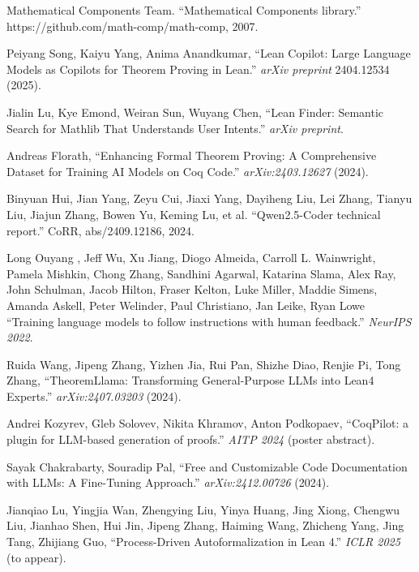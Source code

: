 \documentclass[11pt,a4paper]{article}
\begin{document}
\newpage

\begin{thebibliography}{9}

    Mathematical Components Team.
    ``Mathematical Components library.''
    https://github.com/math-comp/math-comp, 2007.
    
    Peiyang Song, Kaiyu Yang, Anima Anandkumar,
    ``Lean Copilot: Large Language Models as Copilots for Theorem Proving in Lean.''
    \emph{arXiv preprint} 2404.12534 (2025).

    Jialin Lu, Kye Emond, Weiran Sun, Wuyang Chen,
    ``Lean Finder: Semantic Search for Mathlib That Understands User Intents.''
    \emph{arXiv preprint}.

    Andreas Florath,
    ``Enhancing Formal Theorem Proving: A Comprehensive Dataset for Training AI Models on Coq Code.''
    \emph{arXiv:2403.12627} (2024).

    Binyuan Hui, Jian Yang, Zeyu Cui, Jiaxi Yang, Dayiheng Liu, Lei Zhang, Tianyu Liu, Jiajun Zhang, Bowen
Yu, Keming Lu, et al.
    ``Qwen2.5-Coder technical report.'' CoRR, abs/2409.12186, 2024.

    Long Ouyang , Jeff Wu, Xu Jiang, Diogo Almeida, Carroll L. Wainwright, Pamela Mishkin, Chong Zhang, Sandhini Agarwal, Katarina Slama, Alex Ray, John Schulman, Jacob Hilton, Fraser Kelton, Luke Miller, Maddie Simens, Amanda Askell, Peter Welinder, Paul Christiano, Jan Leike, Ryan Lowe
    ``Training language models to follow instructions with human feedback.''
    \emph{NeurIPS 2022}.

    Ruida Wang, Jipeng Zhang, Yizhen Jia, Rui Pan, Shizhe Diao, Renjie Pi, Tong Zhang,
    ``TheoremLlama: Transforming General-Purpose LLMs into Lean4 Experts.''
    \emph{arXiv:2407.03203} (2024).

    Andrei Kozyrev, Gleb Solovev, Nikita Khramov, Anton Podkopaev,
    ``CoqPilot: a plugin for LLM-based generation of proofs.''
    \emph{AITP 2024} (poster abstract).

    Sayak Chakrabarty, Souradip Pal,
    ``Free and Customizable Code Documentation with LLMs: A Fine-Tuning Approach.''
    \emph{arXiv:2412.00726} (2024).

    Jianqiao Lu, Yingjia Wan, Zhengying Liu, Yinya Huang, Jing Xiong, Chengwu Liu, Jianhao Shen, Hui Jin, Jipeng Zhang, Haiming Wang, Zhicheng Yang, Jing Tang, Zhijiang Guo,
    ``Process-Driven Autoformalization in Lean 4.''
    \emph{ICLR 2025} (to appear).


\end{thebibliography}
\end{document}
